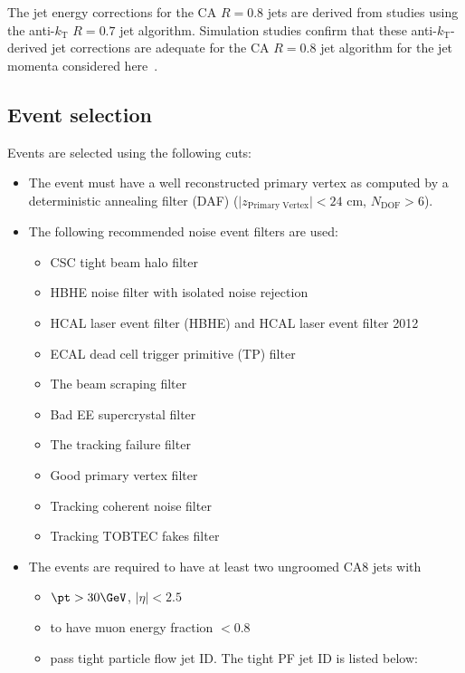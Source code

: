 The jet energy corrections for the CA $R=0.8$ jets are derived from studies using the
anti-$k_{\mathrm T}$ $R=0.7$ jet algorithm. Simulation studies confirm that these
anti-$k_{\mathrm T}$-derived jet corrections
are adequate for the CA $R=0.8$ jet algorithm for the jet momenta
considered here~\cite{topwtag_pas}.%


\subsection{Event selection}
\label{event_selection}

Events are selected using the following cuts:
\begin{itemize}
\item The event must have a well reconstructed primary vertex as computed by a deterministic annealing filter (DAF)
($\vert z_\text{Primary Vertex}\vert < 24$ cm, $N_\text{DOF} > 6$).
\item The following recommended noise event filters are used:
       \begin{itemize}
          \item  CSC tight beam halo filter
          \item  HBHE noise filter with isolated noise rejection
          \item  HCAL laser event filter (HBHE) and HCAL laser event filter 2012
          \item  ECAL dead cell trigger primitive (TP) filter
          \item  The beam scraping filter
          \item  Bad EE supercrystal filter
          \item  The tracking failure filter
          \item  Good primary vertex filter 
	  \item  Tracking coherent noise filter
	  \item  Tracking TOBTEC fakes filter  
       \end{itemize}
\item The events are required to have at least two ungroomed CA8 jets with
        \begin{itemize}
          \item $\pt > 30 \GeVc$, $|\eta| < 2.5$
          \item  to have muon energy fraction $< 0.8$
          \item pass tight particle flow jet ID. The tight PF jet ID is listed below:

\end{itemize}
\end{itemize}
